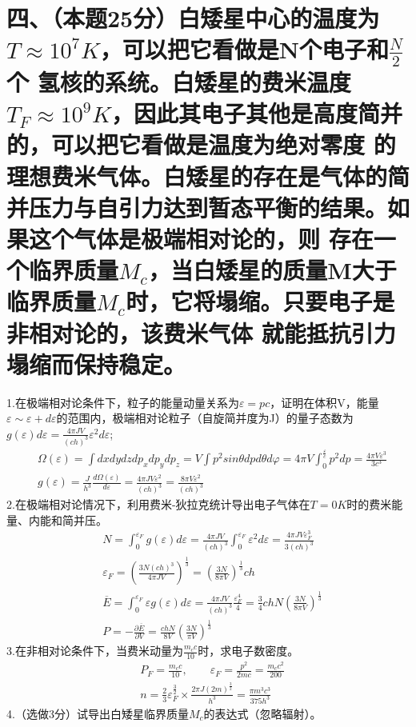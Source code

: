 \documentclass[UTF8]{ctexart}
\begin{document}
\section*{四、（本题25分）白矮星中心的温度为$T\approx10^7K$，可以把它看做是N个电子和$\frac{N}{2}$个
  氢核的系统。白矮星的费米温度$T_F\approx 10^9K$，因此其电子其他是高度简并的，可以把它看做是温度为绝对零度
  的理想费米气体。白矮星的存在是气体的简并压力与自引力达到暂态平衡的结果。如果这个气体是极端相对论的，则
  存在一个临界质量$M_c$，当白矮星的质量M大于临界质量$M_c$时，它将塌缩。只要电子是非相对论的，该费米气体
  就能抵抗引力塌缩而保持稳定。}
1.在极端相对论条件下，粒子的能量动量关系为$\varepsilon=pc$，证明在体积V，能量$\varepsilon\sim\varepsilon
  +d\varepsilon$的范围内，极端相对论粒子（自旋简并度为J）的量子态数为$g(\varepsilon)d\varepsilon=
  \frac{4\pi JV}{(ch)^3}\varepsilon^2d\varepsilon$;
\begin{equation*}
  \begin{aligned}
     & \Omega(\varepsilon)=\int dxdydzdp_xdp_ydp_z
    =V\int p^2sin\theta dpd\theta d\varphi
    =4\pi V\int_0^{\frac{\varepsilon}{c}} p^2dp
    =\frac{4\pi V\varepsilon^3}{3c^3}                                        \\
     & g(\varepsilon)=\frac{J}{h^3}\frac{d\Omega(\varepsilon)}{d\varepsilon}
    =\frac{4\pi JV\varepsilon^2}{(ch)^3}=\frac{8\pi V\varepsilon^2}{(ch)^3}
  \end{aligned}
\end{equation*}
2.在极端相对论情况下，利用费米-狄拉克统计导出电子气体在$T=0K$时的费米能量、内能和简并压。
\begin{equation*}
  \begin{aligned}
     & N=\int_0^{\varepsilon_F}g(\varepsilon)d\varepsilon
    =\frac{4\pi JV}{(ch)^3}\int_0^{\varepsilon_F}\varepsilon^2d\varepsilon
    =\frac{4\pi JV\varepsilon_F^3}{3(ch)^3}                                      \\
     & \varepsilon_F=(\frac{3N(ch)^3}{4\pi JV})^{\frac{1}{3}}
    =(\frac{3N}{8\pi V})^{\frac{1}{3}}ch                                         \\
     & \overline{E}=\int_0^{\varepsilon_F}\varepsilon g(\varepsilon)d\varepsilon
    =\frac{4\pi JV}{(ch)^3}\frac{\varepsilon_F^4}{4}
    =\frac{3}{4}chN(\frac{3N}{8\pi V})^\frac{1}{3}                               \\
     & P=-\frac{\partial\overline{E}}{\partial V}
    =\frac{chN}{8V}(\frac{3N}{\pi V})^\frac{1}{3}
  \end{aligned}
\end{equation*}
3.在非相对论条件下，当费米动量为$\frac{m_cc}{10}$时，求电子数密度。
\begin{equation*}
  \begin{aligned}
     & P_F=\frac{m_cc}{10},\quad\quad
    \varepsilon_F=\frac{p^2}{2mc}=\frac{m_cc^2}{200}                                  \\
     & n=\frac{2}{3}\varepsilon_F^\frac{3}{2}\times\frac{2\pi J(2m)^\frac{3}{2}}{h^3}
    =\frac{\pi m^3c^3}{375h^3}
  \end{aligned}
\end{equation*}
4.（选做3分）试导出白矮星临界质量$M_c$的表达式（忽略辐射）。
\end{document}
